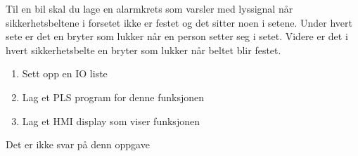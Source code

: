 


Til en bil skal du lage en alarmkrets som varsler med lyssignal når
sikkerhetsbeltene i forsetet ikke er festet og det sitter noen i setene.
Under hvert sete er det en bryter som lukker når en person setter
seg i setet. Videre er det i hvert sikkerhetsbelte en bryter som lukker
når beltet blir festet.
\begin{enumerate}
\item Sett opp en IO liste
\item Lag et PLS program for denne funksjonen
\item Lag et HMI display som viser funksjonen 
\end{enumerate}
\vskip 10pt





Det er ikke svar på denn oppgave












